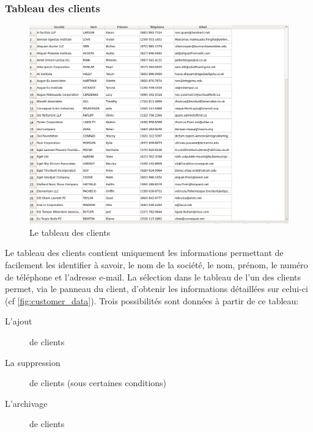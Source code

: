 \subsubsection{Tableau des clients}
\begin{figure}[H]
	\centering
	\includegraphics[width=15cm]{screens/clients.png}
	\caption{Le tableau des clients}
	\label{fig:customers_table}
\end{figure}

Le tableau des clients contient uniquement les informations permettant de facilement les identifier à
savoir, le nom de la société, le nom, prénom, le numéro de téléphone et l’adresse e-mail. La sélection
dans le tableau de l’un des clients permet, via le panneau du client, d’obtenir les informations
détaillées sur celui-ci (cf \ref{fig:customer_data}). Trois possibilités sont données à partir de ce tableau: 
\begin{description}
	\item[L'ajout] de clients
	\item[La suppression] de clients (sous certaines conditions)
	\item[L'archivage] de clients
\end{description}

